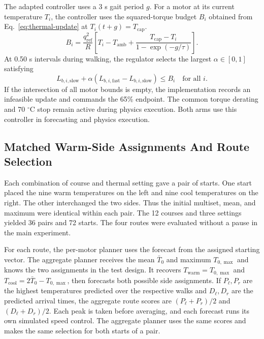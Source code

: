\documentclass{ieeeaccess}
\begin{document}
The adapted controller uses a 3 s gait period $g$. For a motor at its current temperature $T_i$, the controller uses the squared-torque budget $B_i$ obtained from Eq.~\eqref{eq:thermal-update} at $T_i(t+g)=T_{\mathrm{cap}}$.
\begin{equation}
B_i = \frac{q_{\mathrm{ref}}^2}{R}
    \left[T_i-T_{\mathrm{amb}}
      +\frac{T_{\mathrm{cap}}-T_i}{1-\exp(-g/\tau)}\right].
\label{eq:squared-torque-budget}
\end{equation}
At 0.50 s intervals during walking, the regulator selects the largest $\alpha\in[0,1]$ satisfying
\begin{equation}
L_{b,i,\mathrm{slow}}+\alpha
  (L_{b,i,\mathrm{fast}}-L_{b,i,\mathrm{slow}})\leq B_i
  \quad\text{for all }i .
\label{eq:speed-constraints}
\end{equation}
If the intersection of all motor bounds is empty, the implementation records an infeasible update and commands the 65\% endpoint. The common torque derating and 70 \ensuremath{{}^{\circ}\mathrm{C}} stop remain active during physics execution. Both arms use this controller in forecasting and physics execution.

\subsection{Matched Warm-Side Assignments And Route Selection}

Each combination of course and thermal setting gave a pair of starts. One start placed the nine warm temperatures on the left and nine cool temperatures on the right. The other interchanged the two sides. Thus the initial multiset, mean, and maximum were identical within each pair. The 12 courses and three settings yielded 36 pairs and 72 starts. The four routes were evaluated without a pause in the main experiment.

For each route, the per-motor planner uses the forecast from the assigned starting vector. The aggregate planner receives the mean $\bar T_0$ and maximum $T_{0,\max}$ and knows the two assignments in the test design. It recovers $T_{\mathrm{warm}}=T_{0,\max}$ and $T_{\mathrm{cool}}=2\bar T_0-T_{0,\max}$, then forecasts both possible side assignments. If $P_\ell,P_r$ are the highest temperatures predicted over the respective walks and $D_\ell,D_r$ are the predicted arrival times, the aggregate route scores are $(P_\ell+P_r)/2$ and $(D_\ell+D_r)/2$. Each peak is taken before averaging, and each forecast runs its own simulated speed control. The aggregate planner uses the same scores and makes the same selection for both starts of a pair.
\end{document}

